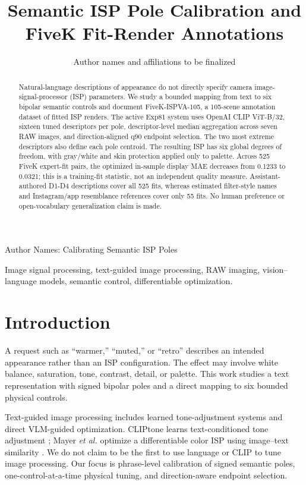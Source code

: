 \documentclass[journal]{IEEEtran}
\begin{document}
\title{Semantic ISP Pole Calibration and FiveK Fit-Render Annotations}
\author{Author names and affiliations to be finalized}
%
{Author Names: Calibrating Semantic ISP Poles}
\maketitle

\begin{abstract}
Natural-language descriptions of appearance do not directly specify camera image-signal-processor (ISP) parameters. We study a bounded mapping from text to six bipolar semantic controls and document FiveK-ISPVA-105, a 105-scene annotation dataset of fitted ISP renders. The active Exp81 system uses OpenAI CLIP ViT-B/32, sixteen tuned descriptors per pole, descriptor-level median aggregation across seven RAW images, and direction-aligned q90 endpoint selection. The two most extreme descriptors also define each pole centroid. The resulting ISP has six global degrees of freedom, with gray/white and skin protection applied only to palette. Across 525 FiveK expert-fit pairs, the optimized in-sample display MAE decreases from 0.1233 to 0.0321; this is a training-fit statistic, not an independent quality measure. Assistant-authored D1-D4 descriptions cover all 525 fits, whereas estimated filter-style names and Instagram/app resemblance references cover only 55 fits. No human preference or open-vocabulary generalization claim is made.
\end{abstract}

\begin{IEEEkeywords}
Image signal processing, text-guided image processing, RAW imaging, vision--language models, semantic control, differentiable optimization.
\end{IEEEkeywords}

\section{Introduction}
A request such as ``warmer,'' ``muted,'' or ``retro'' describes an intended appearance rather than an ISP configuration. The effect may involve white balance, saturation, tone, contrast, detail, or palette. This work studies a text representation with signed bipolar poles and a direct mapping to six bounded physical controls.

Text-guided image processing includes learned tone-adjustment systems and direct VLM-guided optimization. CLIPtone learns text-conditioned tone adjustment \cite{lee2024cliptone}; Mayer \emph{et al.} optimize a differentiable color ISP using image--text similarity \cite{mayer2025language}. We do not claim to be the first to use language or CLIP to tune image processing. Our focus is phrase-level calibration of signed semantic poles, one-control-at-a-time physical tuning, and direction-aware endpoint selection.
\end{document}
